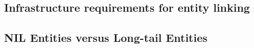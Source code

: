 \subsection{Infrastructure requirements for entity linking}
\subsection{NIL Entities versus Long-tail Entities}
